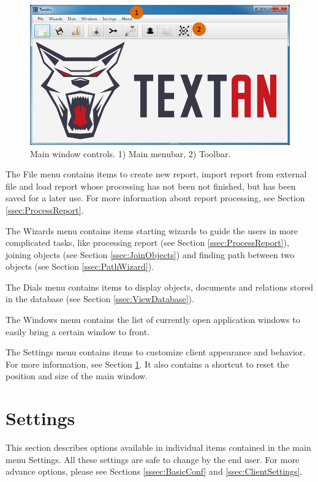 \begin{figure}[!htb]
        \centering
        \includegraphics[width=\textwidth]{Images/main}
        \caption{Main window controls. 1) Main menubar, 2) Toolbar.}
        \label{fig:MainWindow}
\end{figure}

The File menu contains items to create new report, import report from external
file and load report whose processing has not been not finished, but has been
saved for a later use. For more information about report processing, see
Section \ref{ssec:ProcessReport}.

The Wizards menu contains items starting wizards to guide the users in more
complicated tasks, like processing report (see Section
\ref{ssec:ProcessReport}), joining objects (see Section \ref{ssec:JoinObjects})
and finding path between two objects (see Section \ref{ssec:PathWizard}).

The Dials  menu contains items to display objects,
documents and relations stored in the database (see Section
\ref{ssec:ViewDatabase}).

The Windows menu contains the list of currently open application windows
to easily bring a certain window to front.

The Settings menu contains items to customize \textan{} client appearance and
behavior. For more information, see Section \ref{ssec:Settings}. It also
contains a shortcut to reset the position and size of the main window.

\section{Settings}
\label{ssec:Settings}

This section describes options available in individual items contained in the
main menu Settings. All these settings are safe to change by the end user. For
more advance options, please see Sections \ref{sssec:BasicConf} and
\ref{ssec:ClientSettings}.

